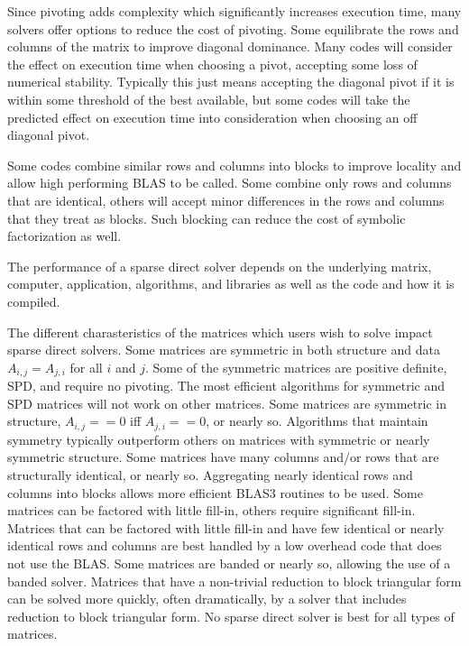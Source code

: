 \documentclass[acmtocl]{acmtrans2m}
\begin{document}
Since pivoting adds complexity which significantly increases execution
time, many solvers offer options to reduce the cost of pivoting.  Some
equilibrate the rows and columns of the matrix to improve diagonal
dominance.  Many codes will consider the effect on execution time when
choosing a pivot, accepting some loss of numerical stability.
Typically this just means accepting the diagonal pivot if it is within
some threshold of the best available, but some codes will take the
predicted effect on execution time into consideration when choosing an off
diagonal pivot.

Some codes combine similar rows and columns into blocks to improve
locality and allow high performing BLAS to be called.  Some combine
only rows and columns that are identical, others will accept minor
differences in the rows and columns that they treat as blocks.  Such
blocking can reduce the cost of symbolic factorization as well.

The performance of a sparse direct solver depends on the underlying
matrix, computer, application, algorithms, and libraries as well as
the code and how it is compiled.  

The different charasteristics of the matrices which users wish to
solve impact sparse direct solvers.  Some matrices are symmetric in both
structure and data $A_{i,j} = A_{j,i}$ for all $i$ and $j$.  Some of
the symmetric matrices are positive definite, SPD, and require no
pivoting.  The most efficient algorithms for symmetric and SPD
matrices will not work on other matrices.  Some matrices are symmetric in
structure, $A_{i,j} == 0$ iff $A_{j,i} == 0$, or nearly so.
Algorithms that maintain symmetry typically outperform others on
matrices with symmetric or nearly symmetric structure.  Some matrices have many
columns and/or rows that are structurally identical, or nearly so.
Aggregating nearly identical rows and columns into blocks allows more
efficient BLAS3 routines to be used.  Some matrices can be factored with little
fill-in, others require significant fill-in.  Matrices that can be
factored with little fill-in and have few identical or nearly identical
rows and columns are best handled by a low overhead code that does not
use the BLAS.  Some matrices are banded or nearly so, allowing the use
of a banded solver.  Matrices that have a non-trivial reduction to
block triangular form can be solved more quickly, often dramatically,
by a solver that includes reduction to block triangular form.  No sparse direct solver is best for all types of matrices.  
\end{document}
